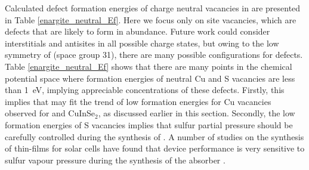 \documentclass[11pt, twoside]{report}
\begin{document}
Calculated defect formation energies of charge neutral vacancies in {\enargite} are presented in Table \ref{enargite_neutral_Ef}. 
Here we focus only on site vacancies, which are defects that are likely to form in abundance. Future work could consider interstitials and antisites in all possible charge states, but owing to the low symmetry of {\enargite} (space group 31), there are many possible configurations for defects.
Table \ref{enargite_neutral_Ef} shows that there are many points in the chemical potential space where formation energies of neutral Cu and S vacancies are less than \SI{1}{eV}, implying appreciable concentrations of these defects. Firstly, this implies that {\enargite} may fit the trend of low formation energies for Cu vacancies observed for {\CZTS} and CuInSe$_2$, as discussed earlier in this section. Secondly, the low formation energies of S vacancies implies that sulfur partial pressure should be carefully controlled during the synthesis of {\enargite}. A number of studies on the synthesis of {\CZTS} thin-films for solar cells have found that device performance is very sensitive to sulfur vapour pressure during the synthesis of the absorber \cite{CZTS_S_pressure1, CZTS_S_pressure2, CZTS_S_pressure3}.



\end{document}
